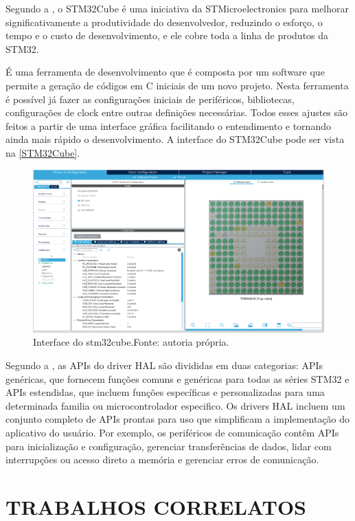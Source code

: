 Segundo a , o STM32Cube é uma iniciativa da STMicroelectronics para melhorar significativamente a produtividade do desenvolvedor, reduzindo o esforço, o tempo e o custo de desenvolvimento, e ele cobre toda a linha de produtos da STM32.

É uma ferramenta de desenvolvimento que é composta por um software que permite a geração de códigos em C iniciais de um novo projeto. Nesta ferramenta é possível já fazer as configurações iniciais de periféricos, bibliotecas, configurações de clock entre outras definições necessárias. Todos esses ajustes são feitos a partir de uma interface gráfica facilitando o entendimento e tornando ainda mais rápido o desenvolvimento. A interface do STM32Cube pode ser vista na \autoref{STM32Cube}.
\begin{figure}[H]
    \scriptsize
     \centering
     \includegraphics[scale=0.43]{dados/figuras/stm32cube.png}
     \caption{Interface do stm32cube.\newline  Fonte: autoria própria.}
     \label{STM32Cube}
\end{figure}

Segundo a , as APIs do driver HAL são divididas em duas categorias: APIs genéricas, que fornecem funções comuns e genéricas para todas as séries STM32 e APIs estendidas, que incluem funções específicas e personalizadas para uma determinada familia ou microcontrolador especifico. Os drivers HAL incluem um conjunto completo de APIs prontas para uso que simplificam a implementação do aplicativo do usuário. Por exemplo, os periféricos de comunicação contêm APIs para inicialização e configuração, gerenciar transferências de dados, lidar com interrupções ou acesso direto a memória e gerenciar erros de comunicação.

\section{TRABALHOS CORRELATOS}

